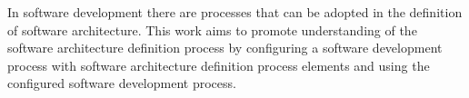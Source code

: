 In software development there are processes that can be adopted in the definition of software architecture. This work aims to promote understanding of the software architecture definition process by configuring a software development process with software architecture definition process elements and using the configured software development process.